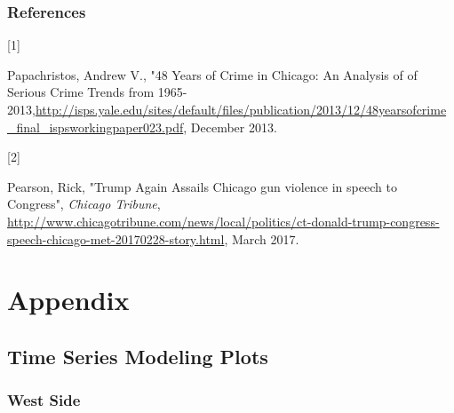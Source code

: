 \documentclass{article} %
\begin{document}
\newpage


\subsubsection*{References}


\hypertarget{Ref1}{[1]} Papachristos, Andrew V., "48 Years of Crime in Chicago: An Analysis of of Serious Crime Trends from 1965-2013,\url{http://isps.yale.edu/sites/default/files/publication/2013/12/48yearsofcrime_final_ispsworkingpaper023.pdf}, December 2013.

\hypertarget{Ref2}{[2]} Pearson, Rick, "Trump Again Assails Chicago gun violence in speech to Congress", \textit{Chicago Tribune}, \url{http://www.chicagotribune.com/news/local/politics/ct-donald-trump-congress-speech-chicago-met-20170228-story.html}, March 2017.


\clearpage
\newpage

\section{Appendix}
\label{appendix}


\subsection{Time Series Modeling Plots}
\label{appendix_regression}

 
\subsubsection{West Side}
 
\end{document}

